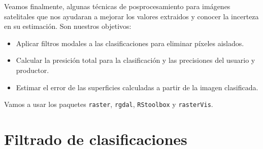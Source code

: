 Veamos finalmente, algunas t\'ecnicas de posprocesamiento para im\'agenes satelitales que nos ayudaran a mejorar los valores extraidos y conocer la incerteza en su estimaci\'on. Son nuestros objetivos:

\begin{itemize}
  \item Aplicar filtros modales a las clasificaciones para eliminar p\'ixeles aislados.
  \item Calcular la presici\'on total para la clasificaci\'on y las precisiones del usuario y productor.
  \item Estimar el error de las superficies calculadas a partir de la imagen clasificada.
\end{itemize}

Vamos a usar los paquetes \texttt{raster}, \texttt{rgdal}, \texttt{RStoolbox} y \texttt{rasterVis}.

\section{Filtrado de clasificaciones}

